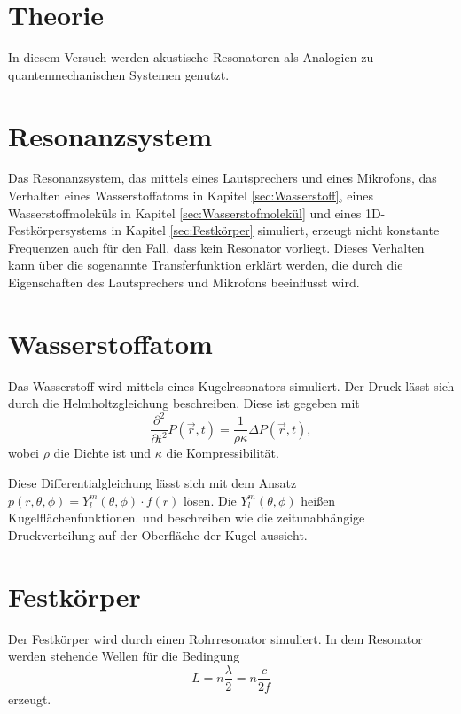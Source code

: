 \section{Theorie}
\label{sec:Theorie}

In diesem Versuch werden akustische Resonatoren als Analogien zu quantenmechanischen Systemen genutzt. 

\section{Resonanzsystem}

Das Resonanzsystem, das mittels eines Lautsprechers und eines Mikrofons, das Verhalten eines Wasserstoffatoms in Kapitel \ref{sec:Wasserstoff}, eines Wasserstoffmoleküls in Kapitel \ref{sec:Wasserstofmolekül} und eines 1D-Festkörpersystems in Kapitel \ref{sec:Festkörper} simuliert, erzeugt nicht konstante Frequenzen auch für den Fall, dass kein Resonator vorliegt.
Dieses Verhalten kann über die sogenannte Transferfunktion erklärt werden, die durch die Eigenschaften des Lautsprechers und Mikrofons beeinflusst wird. 


\section{Wasserstoffatom}

Das Wasserstoff wird mittels eines Kugelresonators simuliert. Der Druck lässt sich durch die Helmholtzgleichung beschreiben. 
Diese ist gegeben mit 
\begin{equation*}
    \frac{\partial^2}{\partial t^2} P(\vec r,t) = \frac{1}{\rho\kappa} \Delta P(\vec r,t),
\end{equation*}
wobei $\rho$ die Dichte ist und $\kappa$ die Kompressibilität. 

Diese Differentialgleichung lässt sich mit dem Ansatz $p(r, \theta, \phi) = Y^m_l(\theta, \phi) \cdot f(r)$ lösen.
Die $Y^m_l(\theta, \phi)$ heißen Kugelflächenfunktionen. und beschreiben wie die zeitunabhängige Druckverteilung auf der Oberfläche der Kugel aussieht. 



\section{Festkörper}

Der Festkörper wird durch einen Rohrresonator simuliert. In dem Resonator werden stehende Wellen für die Bedingung 
\begin{equation*}
    L = n \frac{\lambda}{2} = n \frac{c}{2f}
\end{equation*}
erzeugt. 

